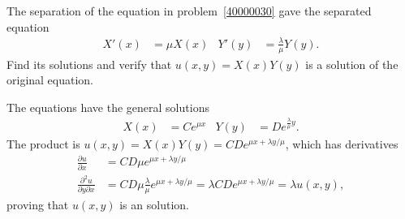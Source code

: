 The separation of the equation in problem~\ref{40000030} gave the
separated equation
\begin{align*}
X'(x) &=\mu X(x)
&
Y'(y) &=\frac{\lambda}{\mu} Y(y).
\end{align*}
Find its solutions and verify that $u(x,y)= X(x)Y(y)$ is a solution
of the original equation.

\begin{loesung}
The equations have the general solutions
\begin{align*}
X(x) &= Ce^{\mu x}
&
Y(y) &= De^{\frac{\lambda}{\mu}y}.
\end{align*}
The product is $u(x,y)=X(x)Y(y) = CD e^{\mu x + \lambda y/\mu}$, which
has derivatives
\begin{align*}
\frac{\partial u}{\partial x}
&=
CD \mu e^{\mu x+\lambda y /\mu}
\\
\frac{\partial^2 u}{\partial y\partial x}
&=
CD \mu \frac{\lambda}{\mu} e^{\mu x+\lambda y /\mu}
=
\lambda CD e^{\mu x + \lambda y/\mu}
=
\lambda u(x,y),
\end{align*}
proving that $u(x,y)$ is an solution.
\end{loesung}
